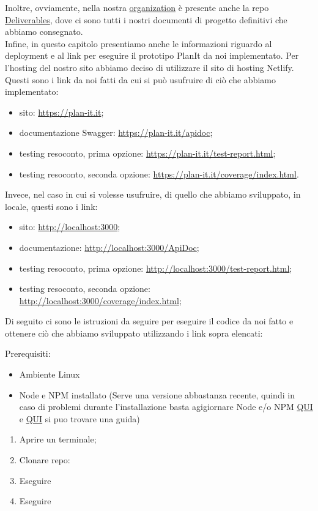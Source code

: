 Inoltre, ovviamente, nella nostra \href{https://github.com/orgs/Life-planner/repositories}{organization} è presente anche la repo \href{https://github.com/Life-planner/Deliverables}{Deliverables}, dove ci sono tutti i nostri documenti di progetto definitivi che abbiamo consegnato. \\
Infine, in questo capitolo presentiamo anche le informazioni riguardo al deployment e al link per eseguire il prototipo PlanIt da noi implementato. Per l'hosting del nostro sito abbiamo deciso di utilizzare il sito di hosting Netlify. \\ Questi sono i link da noi fatti da cui si può usufruire di ciò che abbiamo implementato:
\begin{itemize}
    \item sito: \url{https://plan-it.it};
    \item documentazione Swagger: \url{https://plan-it.it/apidoc};
    \item testing resoconto, prima opzione: \url{https://plan-it.it/test-report.html};
    \item testing resoconto, seconda opzione: \url{https://plan-it.it/coverage/index.html}.
\end{itemize}

Invece, nel caso in cui si volesse usufruire, di quello che abbiamo sviluppato, in locale, questi sono i link:

\begin{itemize}
    \item sito: \url{http://localhost:3000};
    \item documentazione: \url{http://localhost:3000/ApiDoc};
    \item testing resoconto, prima opzione: \url{http://localhost:3000/test-report.html};
    \item testing resoconto, seconda opzione: \url{http://localhost:3000/coverage/index.html};

\end{itemize}

Di seguito ci sono le istruzioni da seguire per eseguire il codice da noi fatto e ottenere ciò che abbiamo sviluppato utilizzando i link sopra elencati:

Prerequisiti:
\begin{itemize}
    \item Ambiente Linux
    \item Node e NPM installato (Serve una versione abbastanza recente, quindi in caso di problemi durante l'installazione basta agigiornare Node e/o NPM \href{https://www.freecodecamp.org/news/how-to-update-node-and-npm-to-the-latest-version/}{QUI} e \href{https://docs.npmjs.com/try-the-latest-stable-version-of-npm}{QUI} si puo trovare una guida)
\end{itemize}

\begin{enumerate}
    \item Aprire un terminale;
    \item Clonare repo: 
    \item Eseguire 
    \item Eseguire 
\end{enumerate}
